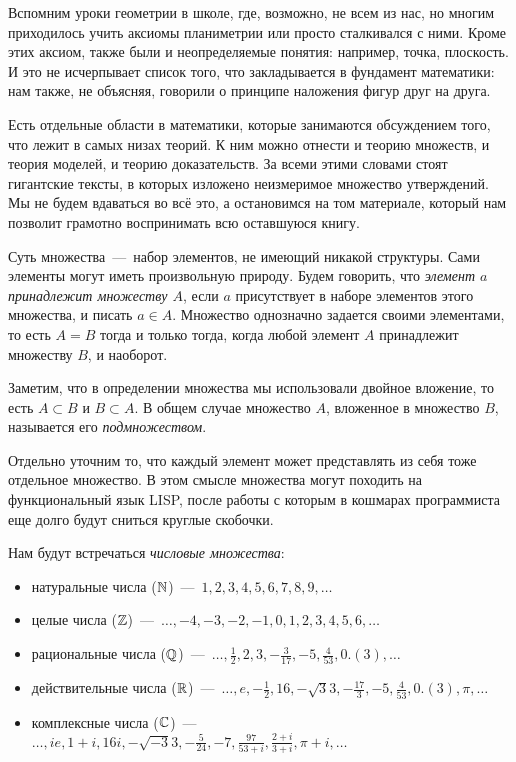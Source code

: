
	Вспомним уроки геометрии в школе, где, возможно, не всем из нас, но многим приходилось учить аксиомы планиметрии 
	или просто сталкивался с ними. Кроме этих аксиом, также были и неопределяемые понятия: например, точка, плоскость. 
	И это не исчерпывает список того, что закладывается в фундамент математики: нам также, не объясняя, говорили о принципе 
	наложения фигур друг на друга.
	
	Есть отдельные области в математики, которые занимаются обсуждением того, что лежит в самых низах теорий. К ним можно отнести 
	и теорию множеств, и теория моделей, и теорию доказательств. За всеми этими словами стоят гигантские тексты, в которых изложено 
	неизмеримое множество утверждений. Мы не будем вдаваться во всё это, а остановимся на том материале, который нам позволит 
	грамотно воспринимать всю оставшуюся книгу.
	
	Суть множества~---~набор элементов, не имеющий никакой структуры. Сами элементы могут иметь произвольную природу. 
	Будем говорить, что \emph{элемент $a$ принадлежит множеству $A$}, если $a$ присутствует в наборе элементов этого множества, 
	и писать $a \in A$. Множество однозначно задается своими элементами, то есть $A = B$ тогда и только тогда, 
	когда любой элемент $A$ принадлежит множеству $B$, и наоборот.
	
	Заметим, что в определении множества мы использовали двойное вложение, то есть $A \subset B$ и $B \subset A$. 
	В общем случае множество $A$, вложенное в множество $B$, называется его \emph{подмножеством}.
	
	Отдельно уточним то, что каждый элемент может представлять из себя тоже отдельное множество. В этом смысле множества 
	могут походить на функциональный язык LISP, после работы с которым в кошмарах программиста еще долго будут сниться круглые скобочки.
	
	Нам будут встречаться \emph{числовые множества}:
	
\begin{itemize}
	\item натуральные числа ($\mathbb{N}$)~---~$1, 2, 3, 4, 5, 6, 7, 8, 9, \dots$
	\item целые числа ($\mathbb{Z}$)~---~$\dots, -4, -3, -2, -1, 0, 1, 2, 3, 4, 5, 6, \dots$
	\item рациональные числа ($\mathbb{Q}$)~---~$\dots,\frac{1}{2}, 2, 3, -\frac{3}{17}, -5, \frac{4}{53}, 0.(3), \dots$
	\item действительные числа ($\mathbb{R}$)~---~$\dots,e, -\frac{1}{2}, 16, -\sqrt{3}3, -\frac{17}{3}, -5, \frac{4}{53}, 0.(3), \pi, \dots$
	\item комплексные числа ($\mathbb{C}$)~---~$\dots, ie, 1 + i, 16i, -\sqrt{-3}3, -\frac{5}{24}, -7, \frac{97}{53 + i}, \frac{2+i}{3+i}, \pi + i, \dots$
\end{itemize}
	
